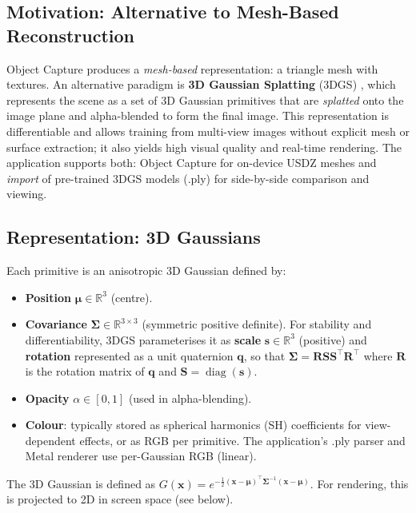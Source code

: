 \subsection{Motivation: Alternative to Mesh-Based Reconstruction}

Object Capture produces a \emph{mesh-based} representation: a triangle mesh with textures. An alternative paradigm is \textbf{3D Gaussian Splatting} (3DGS) \cite{kerbl20233dgs}, which represents the scene as a set of 3D Gaussian primitives that are \emph{splatted} onto the image plane and alpha-blended to form the final image. This representation is differentiable and allows training from multi-view images without explicit mesh or surface extraction; it also yields high visual quality and real-time rendering. The application supports both: Object Capture for on-device USDZ meshes and \emph{import} of pre-trained 3DGS models (.ply) for side-by-side comparison and viewing.

\subsection{Representation: 3D Gaussians}

Each primitive is an anisotropic 3D Gaussian defined by:

\begin{itemize}
    \item \textbf{Position} $\boldsymbol{\mu} \in \mathbb{R}^3$ (centre).
    \item \textbf{Covariance} $\boldsymbol{\Sigma} \in \mathbb{R}^{3 \times 3}$ (symmetric positive definite). For stability and differentiability, 3DGS parameterises it as \textbf{scale} $\mathbf{s} \in \mathbb{R}^3$ (positive) and \textbf{rotation} represented as a unit quaternion $\mathbf{q}$, so that $\boldsymbol{\Sigma} = \mathbf{R} \mathbf{S} \mathbf{S}^\top \mathbf{R}^\top$ where $\mathbf{R}$ is the rotation matrix of $\mathbf{q}$ and $\mathbf{S} = \operatorname{diag}(\mathbf{s})$.
    \item \textbf{Opacity} $\alpha \in [0,1]$ (used in alpha-blending).
    \item \textbf{Colour}: typically stored as spherical harmonics (SH) coefficients for view-dependent effects, or as RGB per primitive. The application's .ply parser and Metal renderer use per-Gaussian RGB (linear).
\end{itemize}

The 3D Gaussian is defined as $G(\mathbf{x}) = e^{-\frac{1}{2}(\mathbf{x}-\boldsymbol{\mu})^\top \boldsymbol{\Sigma}^{-1} (\mathbf{x}-\boldsymbol{\mu})}$. For rendering, this is projected to 2D in screen space (see below).

